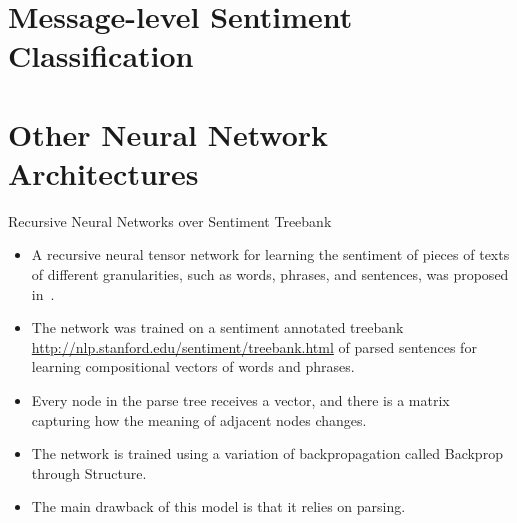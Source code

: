 \documentclass[handout]{beamer}
\begin{document}
\section{Message-level Sentiment Classification}
%

\section{Other Neural Network Architectures}


\begin{frame}{Recursive Neural Networks over Sentiment Treebank}
\begin{scriptsize}
\begin{itemize}
\item A recursive neural tensor network for learning the sentiment of pieces of texts of different granularities, such as words, phrases, and sentences, was proposed in~\cite{socher2013recursive}.
\item The network was trained on a sentiment annotated treebank \url{http://nlp.stanford.edu/sentiment/treebank.html} of parsed sentences for learning compositional vectors of words and phrases.
\item Every node in the parse tree receives a vector, and there is a matrix capturing how the meaning of adjacent nodes changes. 
\item The network is trained using a variation of backpropagation called Backprop through Structure.
\item The main drawback of this model is that it relies on parsing.
\end{itemize}
\end{scriptsize}
\end{frame}
\end{document}
